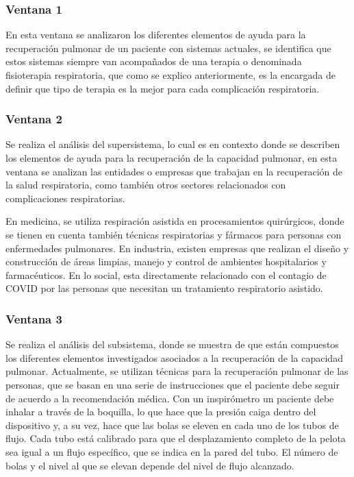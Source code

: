 \documentclass[12pt]{article}
\begin{document}
\subsubsection{Ventana 1}
En esta ventana se analizaron los diferentes elementos de ayuda para la recuperación pulmonar de un paciente con sistemas actuales, se identifica que estos sistemas siempre van acompañados de una terapia o denominada fisioterapia respiratoria, que como se explico anteriormente, es la encargada de definir que tipo de terapia es la mejor para cada complicación respiratoria.



\subsubsection{Ventana 2}

Se realiza el  análisis del supersistema, lo cual es en contexto donde se describen los elementos de ayuda para la recuperación de la capacidad pulmonar, en esta ventana se analizan las entidades o empresas que trabajan en la recuperación de la salud respiratoria, como también otros sectores relacionados con complicaciones respiratorias. 

En medicina, se utiliza respiración asistida en procesamientos quirúrgicos, donde se tienen en cuenta también técnicas respiratorias y fármacos para personas con enfermedades pulmonares. En industria, existen empresas que realizan el diseño y construcción de áreas limpias, manejo y control de ambientes hospitalarios y farmacéuticos. En lo social, esta directamente relacionado con el contagio de COVID por las personas que necesitan un tratamiento respiratorio asistido.

\subsubsection{Ventana 3}

Se realiza el  análisis del subsistema, donde se muestra de que están compuestos los diferentes elementos  investigados asociados a la recuperación de la capacidad pulmonar. Actualmente, se utilizan técnicas para la recuperación pulmonar de las personas, que se basan en una serie de instrucciones que el paciente debe seguir de acuerdo a la recomendación médica. Con un inspirómetro un paciente debe inhalar a través de la boquilla, lo que hace que la presión caiga dentro del dispositivo y, a su vez, hace que las bolas se eleven en cada uno de los tubos de flujo. Cada tubo está calibrado para que el desplazamiento completo de la pelota sea igual a un flujo específico, que se indica en la pared del tubo. El número de bolas y el nivel al que se elevan depende del nivel de flujo alcanzado. 
\end{document}
